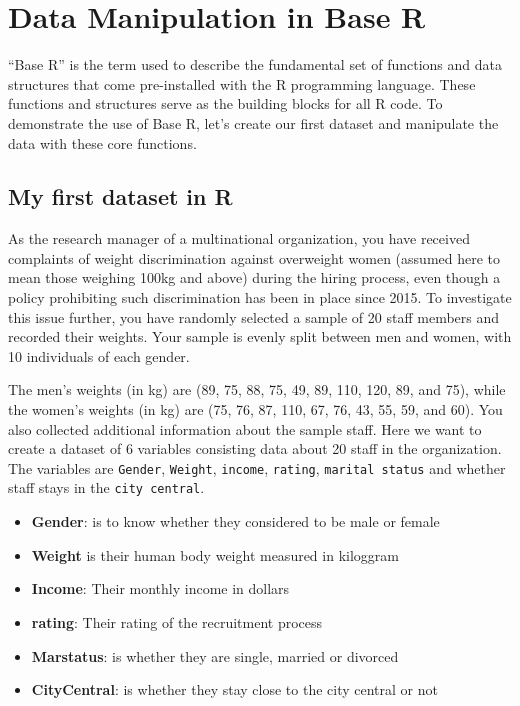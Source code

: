 \documentclass[
]{article}
\providecommand{\tightlist}{%
  \setlength{\itemsep}{0pt}\setlength{\parskip}{0pt}}
\begin{document}
\hypertarget{data-manipulation-in-base-r}{%
\section{Data Manipulation in Base
R}\label{data-manipulation-in-base-r}}

``Base R'' is the term used to describe the fundamental set of functions
and data structures that come pre-installed with the R programming
language. These functions and structures serve as the building blocks
for all R code. To demonstrate the use of Base R, let's create our first
dataset and manipulate the data with these core functions.

\hypertarget{my-first-dataset-in-r}{%
\subsection{My first dataset in R}\label{my-first-dataset-in-r}}

As the research manager of a multinational organization, you have
received complaints of weight discrimination against overweight women
(assumed here to mean those weighing 100kg and above) during the hiring
process, even though a policy prohibiting such discrimination has been
in place since 2015. To investigate this issue further, you have
randomly selected a sample of 20 staff members and recorded their
weights. Your sample is evenly split between men and women, with 10
individuals of each gender.

The men's weights (in kg) are (89, 75, 88, 75, 49, 89, 110, 120, 89, and
75), while the women's weights (in kg) are (75, 76, 87, 110, 67, 76, 43,
55, 59, and 60). You also collected additional information about the
sample staff. Here we want to create a dataset of 6 variables consisting
data about 20 staff in the organization. The variables are
\texttt{Gender}, \texttt{Weight}, \texttt{income}, \texttt{rating},
\texttt{marital\ status} and whether staff stays in the
\texttt{city\ central}.

\begin{itemize}
\tightlist
\item
  \textbf{Gender}: is to know whether they considered to be male or
  female
\item
  \textbf{Weight} is their human body weight measured in kiloggram
\item
  \textbf{Income}: Their monthly income in dollars
\item
  \textbf{rating}: Their rating of the recruitment process
\item
  \textbf{Marstatus}: is whether they are single, married or divorced
\item
  \textbf{CityCentral}: is whether they stay close to the city central
  or not
\end{itemize}
\end{document}
